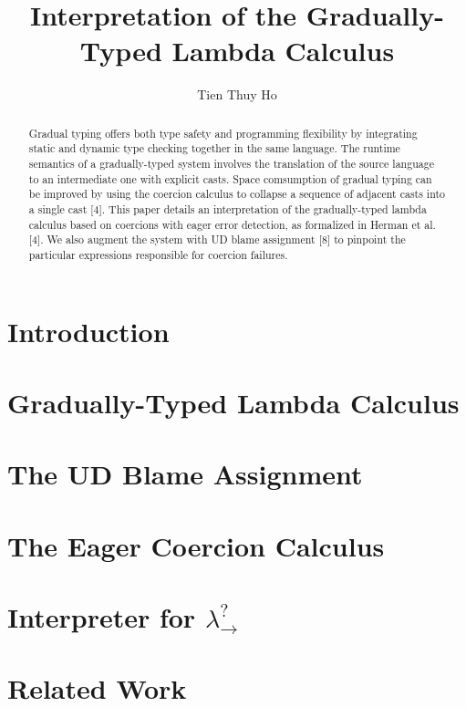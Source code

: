 \documentclass[11pt]{article}
\title{\bf Interpretation of the Gradually-Typed Lambda Calculus}
\author{Tien Thuy Ho}
\begin{document}




\setcounter{page}{3}
\tableofcontents
\listoffigures

\maketitle
{}

\begin{abstract}
Gradual typing offers both type safety and programming flexibility by integrating static and dynamic type checking 
together in the same language. The runtime semantics of a gradually-typed system involves the translation of the 
source language to an intermediate one with explicit casts. Space comsumption of gradual typing can be improved by using 
the coercion calculus to collapse a sequence of adjacent casts into a single cast [4]. This paper details an 
interpretation of the gradually-typed lambda calculus based on coercions with eager error detection, as formalized  
in Herman et al. [4]. We also augment the system with UD blame assignment [8] to pinpoint the particular expressions 
responsible for coercion failures.
\end{abstract}

\section{Introduction} 
\section{Gradually-Typed Lambda Calculus} 
\section{The UD Blame Assignment} 
\section{The Eager Coercion Calculus} 
\section{Interpreter for $\lambda ^? _{\rightarrow}$} 
\section{Related Work} 
\end{document}

